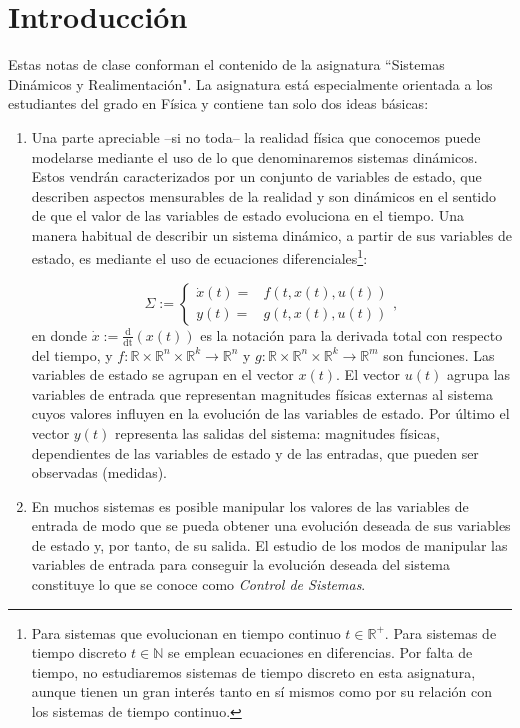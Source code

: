\chapter{Introducción}
Estas notas de clase conforman el contenido de la asignatura ``Sistemas Dinámicos y Realimentación". La asignatura está especialmente orientada  a los estudiantes del grado en Física y contiene tan solo dos ideas básicas:

\begin{enumerate}
\item Una parte apreciable --si no toda-- la realidad física que conocemos puede modelarse mediante el uso de lo que denominaremos sistemas dinámicos. Estos vendrán caracterizados por un conjunto de variables de estado, que describen aspectos mensurables de la realidad y son dinámicos en el sentido de que el valor de las variables de estado evoluciona en el tiempo. Una manera habitual de describir un sistema dinámico, a partir de sus variables de estado, es mediante el uso de ecuaciones diferenciales\footnote{Para sistemas que evolucionan en tiempo continuo $t\in \mathbb{R}^+$. Para sistemas de tiempo discreto $t \in \mathbb{N}$ se emplean ecuaciones en diferencias. Por falta de tiempo, no estudiaremos sistemas de tiempo discreto en esta asignatura, aunque tienen un gran interés tanto en sí mismos como por su relación con los sistemas de tiempo continuo.}:

\begin{equation}
	\Sigma := \begin{cases}
		\dot x(t) =& f(t,x(t),u(t)) \\ y(t) =& g(t,x(t),u(t))
	\end{cases}, 
\end{equation}
en donde $\dot x := \frac{\mathrm{d}}{\mathrm{dt}}(x(t))$ es la notación para la derivada total con respecto del tiempo, y $f:\mathbb{R} \times \mathbb{R}^n \times \mathbb{R}^k \to \mathbb{R}^n$ y $g: \mathbb{R} \times \mathbb{R}^n \times \mathbb{R}^k \to \mathbb{R}^m$ son funciones. Las variables de estado se agrupan en el vector $x(t)$.  El vector $u(t)$ agrupa las variables de entrada que representan magnitudes físicas externas al sistema cuyos valores influyen en la evolución de las variables de estado. Por último el vector $y(t)$ representa las salidas del sistema: magnitudes físicas, dependientes de las variables de estado y de las entradas, que pueden ser observadas (medidas). 

\item En muchos sistemas es posible manipular los valores de las variables de entrada de modo que se pueda obtener una evolución deseada de sus variables de estado y, por tanto, de su salida. El estudio de los modos de manipular las variables de entrada para conseguir la evolución deseada del sistema constituye lo que se conoce como \emph{Control de Sistemas}.


\end{enumerate}
